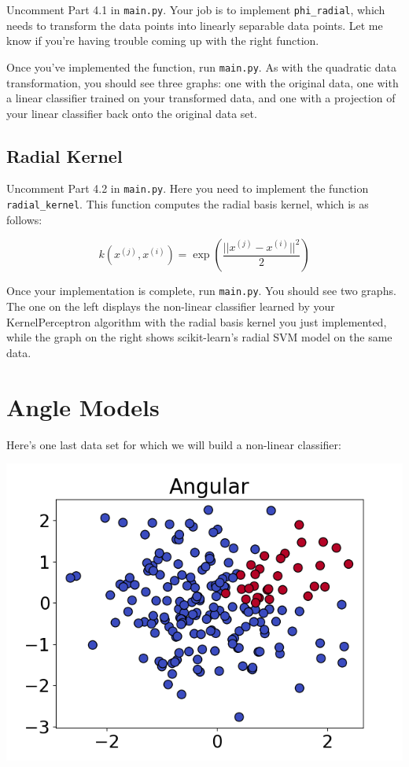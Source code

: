 \documentclass{article}
\begin{document}
Uncomment Part 4.1 in \texttt{main.py}. Your job is to implement \texttt{phi\_radial}, which needs to transform the data points into linearly separable data points. Let me know if you're having trouble coming up with the right function.

Once you've implemented the function, run \texttt{main.py}. As with the quadratic data transformation, you should see three graphs: one with the original data, one with a linear classifier trained on your transformed data, and one with a projection of your linear classifier back onto the original data set.

\subsection{Radial Kernel}

Uncomment Part 4.2 in \texttt{main.py}. Here you need to implement the function \texttt{radial\_kernel}. This function computes the radial basis kernel, which is as follows:

$$k \left( x^{(j)}, x^{(i)} \right) = \exp \left( {\frac{||x^{(j)} - x^{(i)}||^2}{2}} \right)$$

Once your implementation is complete, run \texttt{main.py}. You should see two graphs. The one on the left displays the non-linear classifier learned by your KernelPerceptron algorithm with the radial basis kernel you just implemented, while the graph on the right shows scikit-learn's radial SVM model on the same data.

\section{Angle Models}

Here's one last data set for which we will build a non-linear classifier:

\noindent
\includegraphics[width=\textwidth]{angular.png}
\end{document}
